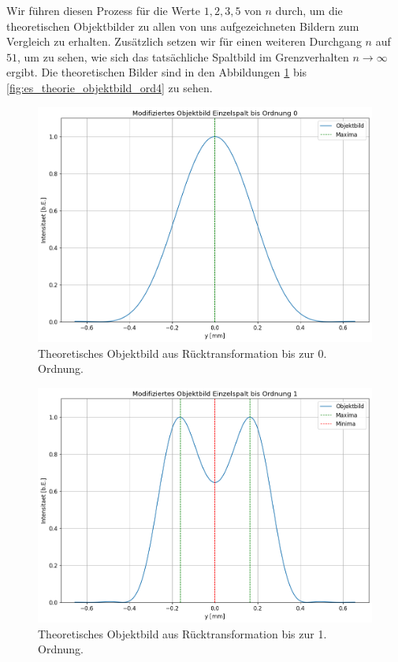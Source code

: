 Wir führen diesen Prozess für die Werte $1, 2, 3, 5$ von $n$ durch, um die theoretischen Objektbilder zu allen von uns aufgezeichneten Bildern zum Vergleich zu erhalten. Zusätzlich setzen wir für einen weiteren Durchgang $n$ auf $51$, um zu sehen, wie sich das tatsächliche Spaltbild im Grenzverhalten $n \to \infty$ ergibt. Die theoretischen Bilder sind in den Abbildungen \ref{fig:es_theorie_objektbild_ord0} bis \ref{fig:es_theorie_objektbild_ord4} zu sehen.

\begin{figure}[H]
  \centering
  \includegraphics[width=.9\textwidth]{files/plots/4/es_theorie_objektbild_ord0.png}
  \caption{Theoretisches Objektbild aus Rücktransformation bis zur 0. Ordnung.}
  \label{fig:es_theorie_objektbild_ord0}
\end{figure}

\begin{figure}[H]
  \centering
  \includegraphics[width=.9\textwidth]{files/plots/4/es_theorie_objektbild_ord1.png}
  \caption{Theoretisches Objektbild aus Rücktransformation bis zur 1. Ordnung.}
  \label{fig:es_theorie_objektbild_ord1}
\end{figure}

